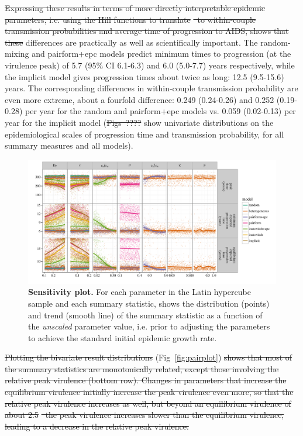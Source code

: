 \documentclass[10pt,letterpaper]{article}
\renewcommand{\figurename}{Fig}
\newcommand{\Lspvl}{$\log_{10}$ SPVL}
\providecommand{\DIFaddtex}[1]{{\protect\color{blue}\uwave{#1}}} %
\providecommand{\DIFdeltex}[1]{{\protect\color{red}\sout{#1}}}                      %
\providecommand{\DIFaddbegin}{} %
\providecommand{\DIFaddend}{} %
\providecommand{\DIFdelbegin}{} %
\providecommand{\DIFdelend}{} %
\providecommand{\DIFadd}[1]{\texorpdfstring{\DIFaddtex{#1}}{#1}} %
\providecommand{\DIFdel}[1]{\texorpdfstring{\DIFdeltex{#1}}{}} %
\newcommand{\DIFscaledelfig}{0.5}
\newlength{\DIFdelgraphicswidth} %
\newlength{\DIFdelgraphicsheight} %
\newcommand{\DIFaddincludegraphics}[2][]{{\color{blue}\fbox{\DIFOincludegraphics[#1]{#2}}}} %
\newcommand{\DIFdelincludegraphics}[2][]{%
\sbox{\DIFdelgraphicsbox}{\DIFOincludegraphics[#1]{#2}}%
\settoboxwidth{\DIFdelgraphicswidth}{\DIFdelgraphicsbox} %
\settoboxtotalheight{\DIFdelgraphicsheight}{\DIFdelgraphicsbox} %
\scalebox{\DIFscaledelfig}{%
\parbox[b]{\DIFdelgraphicswidth}{\usebox{\DIFdelgraphicsbox}\\[-\baselineskip] \rule{\DIFdelgraphicswidth}{0em}}\llap{\resizebox{\DIFdelgraphicswidth}{\DIFdelgraphicsheight}{%
\setlength{\unitlength}{\DIFdelgraphicswidth}%
\begin{picture}(1,1)%
\thicklines\linethickness{2pt} %
{\color[rgb]{1,0,0}\put(0,0){\framebox(1,1){}}}%
{\color[rgb]{1,0,0}\put(0,0){\line( 1,1){1}}}%
{\color[rgb]{1,0,0}\put(0,1){\line(1,-1){1}}}%
\end{picture}%
}\hspace*{3pt}}} %
} %
\DeclareRobustCommand{\DIFaddbegin}{\DIFOaddbegin \let\includegraphics\DIFaddincludegraphics} %
\DeclareRobustCommand{\DIFaddend}{\DIFOaddend \let\includegraphics\DIFOincludegraphics} %
\DeclareRobustCommand{\DIFdelbegin}{\DIFOdelbegin \let\includegraphics\DIFdelincludegraphics} %
\DeclareRobustCommand{\DIFdelend}{\DIFOaddend \let\includegraphics\DIFOincludegraphics} %
\begin{document}
\DIFdelbegin \DIFdel{Expressing these results in terms of more directly interpretable epidemic
parameters, i.e. using the Hill functions to translate }%
\DIFdel{\ to
within-couple transmission probabilities and average time of progression
to AIDS, shows that these }\DIFdelend \DIFaddbegin \DIFadd{These }\DIFaddend differences are practically as well as 
scientifically important. The random-mixing and pairform+epc models
predict minimum times to progression (at the virulence peak) of
5.7 (95\% CI 6.1-6.3) and 6.0 (5.0-7.7) years respectively, while
the implicit model gives progression times about twice as long:
12.5 (9.5-15.6) years. The corresponding differences in 
within-couple transmission
probability are even more extreme, about a fourfold difference:
0.249 (0.24-0.26) and 0.252 (0.19-0.28) per year for the 
random and pairform+epc models vs. 0.059 (0.02-0.13) per year
for the implicit model (\DIFdelbegin \DIFdel{Figs~???? }\DIFdelend \DIFaddbegin \DIFadd{\figurename~\ref{fig:unidist} }\DIFaddend show univariate distributions
on the epidemiological scales
of progression time and transmission probability,
for all summary measures and all models).

\begin{figure}[!ht]
\includegraphics[width=\textwidth]{../figures/fig5.pdf}
\caption{{\bf Sensitivity plot.}
For each parameter in the Latin hypercube sample and each summary statistic, shows the distribution (points) and trend (smooth line) of the summary statistic as a function of the \emph{unscaled} parameter value, i.e. prior to adjusting the parameters to achieve the standard initial epidemic growth rate.}
\label{fig:plot_sens}
\end{figure}

\DIFdelbegin \DIFdel{Plotting the bivariate result distributions }\DIFdelend \DIFaddbegin \DIFadd{The bivariate relationships }\DIFaddend (\figurename~\ref{fig:pairplot}) \DIFdelbegin \DIFdel{shows that most of the summary statistics
are monotonically related, except those involving the relative peak virulence
(bottom row). Changes in parameters that increase the equilibrium
virulence initially increase the peak virulence even more, so
that the relative peak virulence increases as well, but beyond
an equilibrium virulence of about 2.5 }%
\DIFdel{\ the peak virulence
increases slower than the equilibrium virulence, leading to a
decrease in the relative peak virulence.
}%
\end{document}

